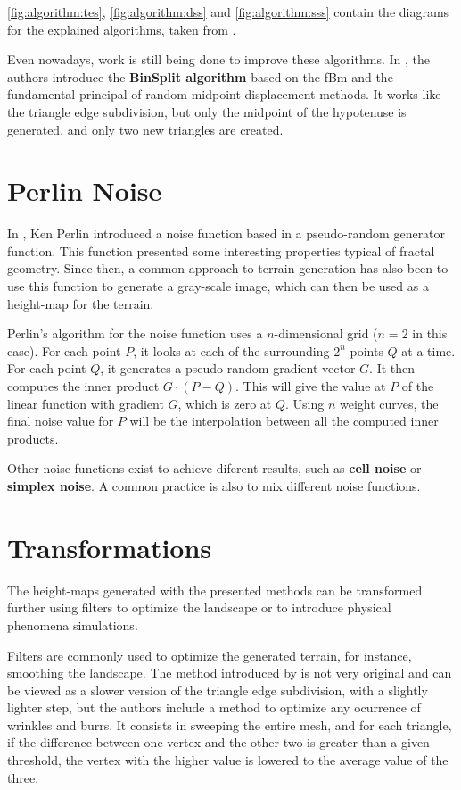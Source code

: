 \documentclass{acmtog}
\begin{document}
\autoref{fig:algorithm:tes}, \autoref{fig:algorithm:dss} and \autoref{fig:algorithm:sss} contain the diagrams for the explained algorithms, taken from \cite{Macklem03}.

Even nowadays, work is still being done to improve these algorithms. In \cite{Chen11}, the authors introduce the \textbf{BinSplit algorithm} based on the fBm and the fundamental principal of random midpoint displacement methods. It works like the triangle edge subdivision, but only the midpoint of the hypotenuse is generated, and only two new triangles are created.

\section{Perlin Noise}
In \cite{Perlin85}, Ken Perlin introduced a noise function based in a pseudo-random generator function. This function presented some interesting properties typical of fractal geometry. Since then, a common approach to terrain generation has also been to use this function to generate a gray-scale image, which can then be used as a height-map for the terrain.

Perlin's algorithm for the noise function uses a $n$-dimensional grid ($n=2$ in this case). For each point $P$, it looks at each of the surrounding $2^{n}$ points $Q$ at a time. For each point $Q$, it generates a pseudo-random gradient vector $G$. It then computes the inner product $G \cdot ( P - Q )$. This will give the value at $P$ of the linear function with gradient $G$, which is zero at $Q$. Using $n$ weight curves, the final noise value for $P$ will be the interpolation between all the computed inner products.

Other noise functions exist to achieve diferent results, such as \textbf{cell noise} or \textbf{simplex noise}. A common practice is also to mix different noise functions.

\section{Transformations}
The height-maps generated with the presented methods can be transformed further using filters to optimize the landscape or to introduce physical phenomena simulations.

Filters are commonly used to optimize the generated terrain, for instance, smoothing the landscape. The method introduced by \cite{Chen11} is not very original and can be viewed as a slower version of the triangle edge subdivision, with a slightly lighter step, but the authors include a method to optimize any ocurrence of wrinkles and burrs. It consists in sweeping the entire mesh, and for each triangle, if the difference between one vertex and the other two is greater than a given threshold, the vertex with the higher value is lowered to the average value of the three.
\end{document}
